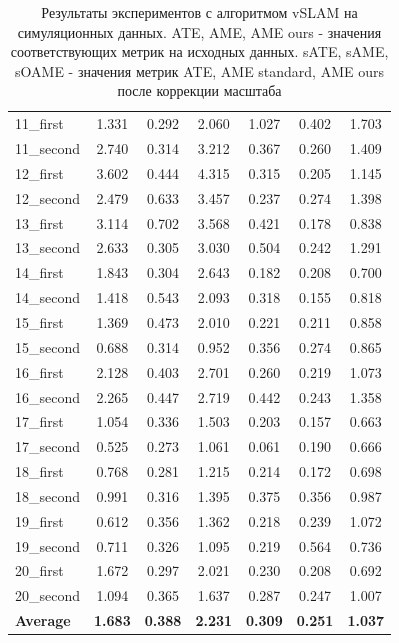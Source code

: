 \documentclass{mipt-thesis-ms}
\begin{document}
\begin{table}
\begin{tabular}{|l|c|c|c|c|c|c|}
			11\_first & 1.331 & 0.292 & 2.060 & 1.027 & 0.402 & 1.703 \\
			11\_second & 2.740 & 0.314 & 3.212 & 0.367 & 0.260 & 1.409 \\
			12\_first & 3.602 & 0.444 & 4.315 & 0.315 & 0.205 & 1.145 \\
			12\_second & 2.479 & 0.633 & 3.457 & 0.237 & 0.274 & 1.398 \\
			13\_first & 3.114 & 0.702 & 3.568 & 0.421 & 0.178 & 0.838 \\
			13\_second & 2.633 & 0.305 & 3.030 & 0.504 & 0.242 & 1.291 \\
			14\_first & 1.843 & 0.304 & 2.643 & 0.182 & 0.208 & 0.700 \\
			14\_second & 1.418 & 0.543 & 2.093 & 0.318 & 0.155 & 0.818 \\
			15\_first & 1.369 & 0.473 & 2.010 & 0.221 & 0.211 & 0.858 \\
			15\_second & 0.688 & 0.314 & 0.952 & 0.356 & 0.274 & 0.865 \\
			16\_first & 2.128 & 0.403 & 2.701 & 0.260 & 0.219 & 1.073 \\
			16\_second & 2.265 & 0.447 & 2.719 & 0.442 & 0.243 & 1.358 \\
			17\_first & 1.054 & 0.336 & 1.503 & 0.203 & 0.157 & 0.663 \\
			17\_second & 0.525 & 0.273 & 1.061 & 0.061 & 0.190 & 0.666 \\
			18\_first & 0.768 & 0.281 & 1.215 & 0.214 & 0.172 & 0.698 \\
			18\_second & 0.991 & 0.316 & 1.395 & 0.375 & 0.356 & 0.987 \\
			19\_first & 0.612 & 0.356 & 1.362 & 0.218 & 0.239 & 1.072 \\
			19\_second & 0.711 & 0.326 & 1.095 & 0.219 & 0.564 & 0.736 \\
			20\_first & 1.672 & 0.297 & 2.021 & 0.230 & 0.208 & 0.692 \\
			20\_second & 1.094 & 0.365 & 1.637 & 0.287 & 0.247 & 1.007 \\
			\hline
			\textbf{Average} & \textbf{1.683} & \textbf{0.388} & \textbf{2.231} & \textbf{0.309} & \textbf{0.251} & \textbf{1.037} \\                      
		\end{tabular}
		\caption{Результаты экспериментов с алгоритмом vSLAM на симуляционных данных. ATE, AME, AME ours - значения соответствующих метрик на исходных данных. sATE, sAME, sOAME - значения метрик ATE, AME standard, AME ours после коррекции масштаба}
		\label{table_maomaps_results}
	\end{table}
	
\end{document}
